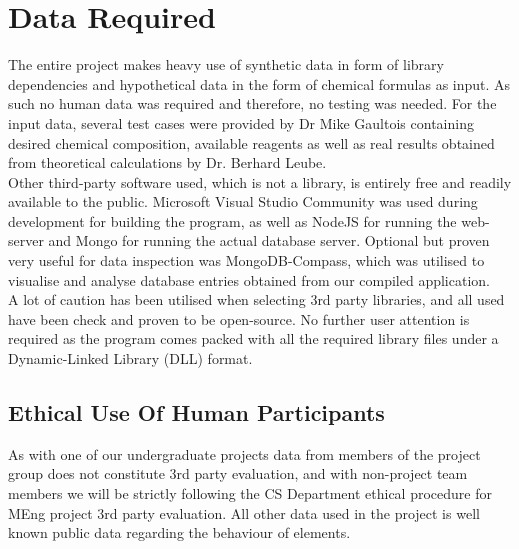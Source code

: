 \chapter{Data Required}
\label{ch:data-required}

The entire project makes heavy use of synthetic data in form of library dependencies and hypothetical data in the form of chemical formulas as input. As such no human data was required and therefore, no testing was needed. For the input data, several test cases were provided by Dr Mike Gaultois containing desired chemical composition, available reagents as well as real results obtained from theoretical calculations by Dr. Berhard Leube. \\

Other third-party software used, which is not a library, is entirely free and readily available to the public. Microsoft Visual Studio Community was used during development for building the program, as well as NodeJS for running the web-server and Mongo for running the actual database server. Optional but proven very useful for data inspection was MongoDB-Compass, which was utilised to visualise and analyse database entries obtained from our compiled application.\\

A lot of caution has been utilised when selecting 3rd party libraries, and all used have been check and proven to be open-source. No further user attention is required as the program comes packed with all the required library files under a Dynamic-Linked Library (DLL) format.

\section{Ethical Use Of Human Participants}
As with one of our undergraduate projects data from members of the project group does not constitute 3rd party evaluation, and with non-project team members we will be strictly following the CS Department ethical procedure for MEng project 3rd party evaluation. All other data used in the project is well known public data regarding the behaviour of elements. \\